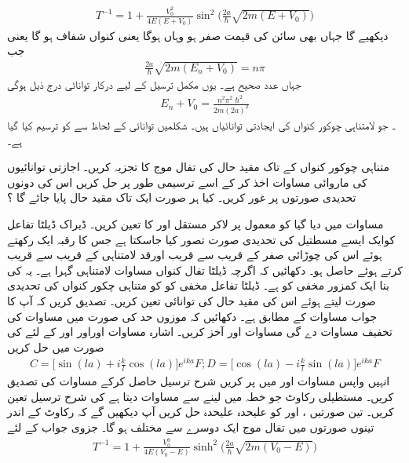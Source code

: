 \begin{align}T^{-1}=1+\frac{V_{0}^{2}}{4E(E+V_{0})}\sin^{2}\big(\frac{2a}{\hslash}\sqrt{2m(E+V_{0})} \big)  \end{align}
 دیکھیے گا جہاں بھی سائن کی قیمت صفر ہو وہاں ہوگا یعنی کنواں شفاف ہو گا یعنی جب\begin{align}\frac{2a}{\hslash}\sqrt{2m(E_{n}+V_{0})}=n\pi \end{align} جہاں   عدد صحیح ہے۔ یوں مکمل ترسیل کے لیے درکار توانائی درج ذیل ہوگی\begin{align}E_{n}+V_{0}=\frac{n^{2}\pi^{2}\hslash^{2}}{2m(2a)^{2}} \end{align}۔
 جو لامتناہی چوکور کنواں کی ایجادتی توانائیاں ہیں۔  شکلمیں توانائی کے لحاظ سے  کو ترسیم کیا گیا ہے۔




متناہی چوکور کنواں کے تاک مقید حال کی تفال  موج کا تجزیہ کریں۔ اجازتی  توانائیوں کی ماروائی مساوات اخذ کر کے اسے ترسیمی طور پر حل کریں اس کی دونوں تحدیدی صورتوں پر غور کریں۔ 
 کیا ہر صورت ایک تاک مقید حال پایا جائے گا ؟ 

 مساوات میں دیا گیا  کو معمول پر لاکر مستقل  اور کا تعین  کریں۔
ڈیراک ڈیلٹا تفاعل کوایک ایسے مسطتیل کی  تحدیدی صورت تصور کیا جاسکتا ہے جس کا  رقبہ ایک  رکھتے ہوئے اس کی چوڑائی صفر کے قریب سے قریب اورقد لامتناہی کے قریب سے قریب کرتے ہوئے حاصل ہو۔ 
دکھائیں کہ اگرچہ ڈیلٹا تفال کنواں مساوات لامتناہی گہرا ہے۔  یہ کی بنا ایک کمزور مخفی کو ہے۔ 
 ڈیلٹا تفاعل مخفی کو کو  متناہی چکور کنواں کی تحدیدی  صورت لیتے ہوئے اس کی مقید حال کی توانائی تعین کریں۔ تصدیق کریں کہ آپ کا جواب مساوات کے مطابق ہے۔ 
 دکھائیں کہ موزوں حد کی صورت میں مساوات کی تخفیف مساوات دے گی 
مساوات  اور  آخز کریں۔  اشارہ مساوات اوراور  اور   کے لئے  کی صورت میں حل کریں
\begin{align}C=\Big[\sin(la)+i\frac{k}{l}\cos(la)   \Big]e^{ika}F ; D=\Big[\cos(la)-i\frac{k}{l}\sin(la)  \Big]e^{ika}F \end{align}
 انہیں واپس مساوات  اور  میں پر کریں شرح ترسیل حاصل کرکے مساوات کی تصدیق کریں۔
مستطیلی رکاوٹ جو خطہ  میں لینے سے مساوات  دیتا ہے کی شرح ترسیل  تعین کریں۔ 
تین صورتیں  ،
اور  کو علیحدہ علیحدہ حل کریں آپ دیکھیں گے کہ رکاوٹ کے اندر تینوں صورتوں میں تفال موج ایک دوسرے سے مختلف ہو گا۔ 
 جزوی جواب  کے لئے
\begin{align}T^{-1}=1+\frac{V_{0}^{0}}{4E(V_{0}-E)}\sinh^{2}\Big(\frac{2a}{\hslash}\sqrt{2m(V_{0}-E)}   \Big) \end{align}

